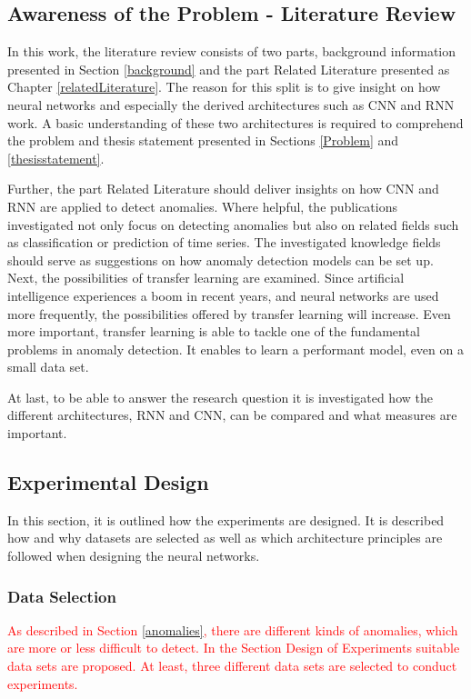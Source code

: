 \newpage
\subsection{Awareness of the Problem - Literature Review}
In this work, the literature review consists of two parts, background information presented in Section \ref{background} and the part Related Literature presented as Chapter \ref{relatedLiterature}. The reason for this split is to give insight on how neural networks and especially the derived architectures such as CNN and RNN work. A basic understanding of these two architectures is required to comprehend the problem and thesis statement presented in Sections \ref{Problem} and \ref{thesisstatement}. 

Further, the part Related Literature should deliver insights on how CNN and RNN are applied to detect anomalies. Where helpful, the publications investigated not only focus on detecting anomalies but also on related fields such as classification or prediction of time series. The investigated knowledge fields should serve as suggestions on how anomaly detection models can be set up. Next, the possibilities of transfer learning are examined. Since artificial intelligence experiences a boom in recent years, and neural networks are used more frequently, the possibilities offered by transfer learning will increase. Even more important, transfer learning is able to tackle one of the fundamental problems in anomaly detection. It enables to learn a performant model, even on a small data set. 

At last, to be able to answer the research question it is investigated how the different architectures, RNN and CNN, can be compared and what measures are important. 

\subsection{Experimental Design}
In this section, it is outlined how the experiments are designed. It is described how and why datasets are selected as well as which architecture principles are followed when designing the neural networks.

\subsubsection{Data Selection}
\textcolor{red}{
As described in Section \ref{anomalies}, there are different kinds of anomalies, which are more or less difficult to detect. In the Section Design of Experiments suitable data sets are proposed. At least, three different data sets are selected to conduct experiments.}
 
